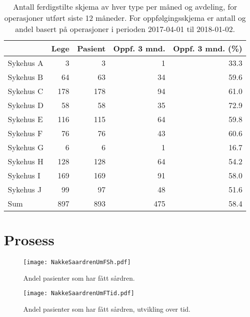 \documentclass[presentation,xcolor=pdftex,dvipsnames,table]{beamer}\usepackage[]{graphicx}\usepackage[]{color}
\begin{document}
\begin{tiny}
\begin{frame}[fragile]
\begin{table}[ht]
\centering
\begin{tabular}{lrrrr}
  \hline
 & Lege & Pasient & Oppf. 3 mnd. & Oppf. 3 mnd. (\%) \\ 
  \hline
Sykehus A & 3 & 3 & 1 & 33.3 \\ 
  Sykehus B & 64 & 63 & 34 & 59.6 \\ 
  Sykehus C & 178 & 178 & 94 & 61.0 \\ 
  Sykehus D & 58 & 58 & 35 & 72.9 \\ 
  Sykehus E & 116 & 115 & 64 & 59.8 \\ 
  Sykehus F & 76 & 76 & 43 & 60.6 \\ 
  Sykehus G & 6 & 6 & 1 & 16.7 \\ 
  Sykehus H & 128 & 128 & 64 & 54.2 \\ 
  Sykehus I & 169 & 169 & 91 & 58.0 \\ 
  Sykehus J & 99 & 97 & 48 & 51.6 \\ 
  Sum & 897 & 893 & 475 & 58.4 \\ 
   \hline
\end{tabular}
\caption{Antall ferdigstilte skjema av hver type per måned og avdeling, for operasjoner
                                  utført siste 12 måneder. For oppfølgingsskjema er antall og andel basert på operasjoner i perioden 2017-04-01 til 2018-01-02.} 
\end{table}

\end{frame}






\section{Prosess}

\begin{frame}[fragile]
\begin{figure}[ht]
\centering
\texttt{[image: NakkeSaardrenUmFSh.pdf]}
\caption[scale=0.3]{Andel pasienter som har fått sårdren. }
\end{figure}
\end{frame}

\begin{frame}[fragile]
\begin{figure}[ht]
\centering
\texttt{[image: NakkeSaardrenUmFTid.pdf]}
\caption{Andel pasienter som har fått sårdren, utvikling over tid. }
\end{figure}
\end{frame}



\end{tiny}
\end{document}
